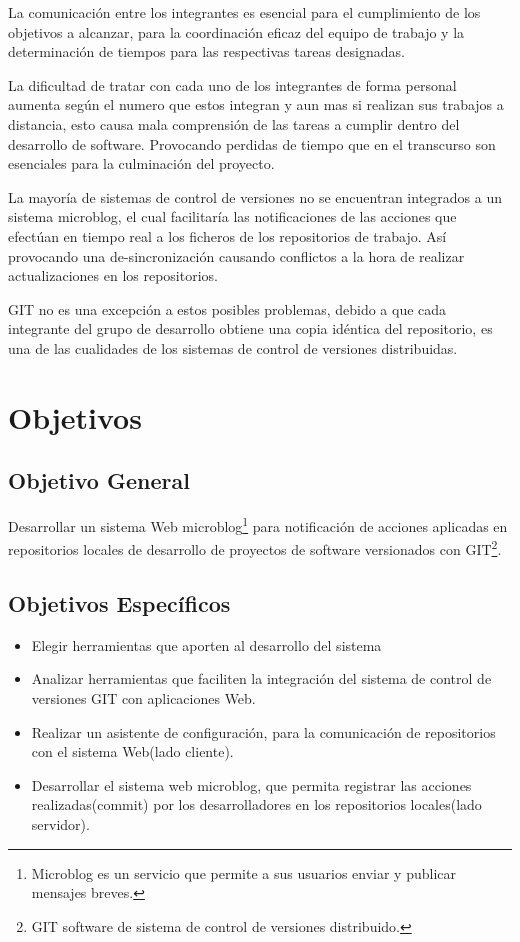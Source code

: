 La comunicación entre los integrantes es esencial para el cumplimiento de los objetivos a alcanzar, para la coordinación eficaz del equipo de trabajo y la determinación de tiempos para las respectivas tareas designadas.

La dificultad de tratar con cada uno de los integrantes de forma personal aumenta según el numero que estos integran y aun mas si realizan sus trabajos a distancia, esto causa mala comprensión de las tareas a cumplir dentro del desarrollo de software. Provocando perdidas de tiempo que en el transcurso son esenciales para la culminación del proyecto.

La mayoría de sistemas de control de versiones no se encuentran integrados a un sistema microblog, el cual facilitaría las notificaciones de las acciones que efectúan en tiempo real a los ficheros de los repositorios de trabajo. Así provocando una de-sincronización causando conflictos a la hora de realizar actualizaciones en los repositorios.

GIT no es una excepción a estos posibles problemas, debido a que cada integrante del grupo de desarrollo obtiene una copia idéntica del repositorio, es una de las cualidades de los sistemas de control de versiones distribuidas.
\section{Objetivos}
\subsection{Objetivo General}
Desarrollar un sistema Web microblog\footnote{Microblog es un servicio que permite a sus usuarios enviar y publicar mensajes breves.
} para notificación de acciones aplicadas en repositorios locales de desarrollo de proyectos de software versionados con GIT\footnote{GIT software de sistema de control de versiones distribuido.
}.

\subsection{Objetivos Específicos}
\begin{itemize}
\item Elegir herramientas que aporten al desarrollo del sistema
\item Analizar herramientas que faciliten la integración del sistema de control 	de versiones GIT con aplicaciones Web.
\item Realizar un asistente de configuración, para la comunicación de 	repositorios con el sistema Web(lado cliente).
\item Desarrollar el sistema web microblog, que permita registrar las acciones realizadas(commit) por los desarrolladores en los repositorios locales(lado servidor).
\end{itemize}

